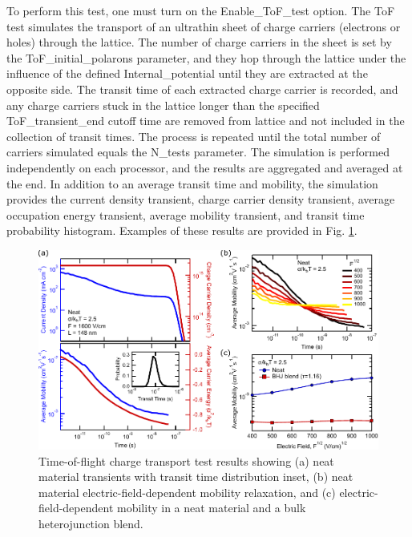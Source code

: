 \documentclass[%
 reprint,onecolumn,notitlepage,
superscriptaddress,longbibliography,
 amsmath,amssymb,
 aps,rmp,floatfix,
]{revtex4-1}
\begin{document}
To perform this test, one must turn on the Enable\_ToF\_test option.
The ToF test simulates the transport of an ultrathin sheet of charge carriers (electrons or holes) through the lattice.
The number of charge carriers in the sheet is set by the ToF\_initial\_polarons parameter, and they hop through the lattice under the influence of the defined Internal\_potential until they are extracted at the opposite side.
The transit time of each extracted charge carrier is recorded, and any charge carriers stuck in the lattice longer than the specified ToF\_transient\_end cutoff time are removed from lattice and not included in the collection of transit times.
The process is repeated until the total number of carriers simulated equals the N\_tests parameter.
The simulation is performed independently on each processor, and the results are aggregated and averaged at the end.
In addition to an average transit time and mobility, the simulation provides the current density transient, charge carrier density transient, average occupation energy transient, average mobility transient, and transit time probability histogram.
Examples of these results are provided in Fig. \ref{fig:tof_example}.

\begin{figure}[h] %
    \centering
    \includegraphics{ToF_example_data.pdf}
    \caption{Time-of-flight charge transport test results showing (a) neat material transients with transit time distribution inset, (b) neat material electric-field-dependent mobility relaxation, and (c) electric-field-dependent mobility in a neat material and a bulk heterojunction blend.}
    \label{fig:tof_example}
\end{figure}
\end{document}
